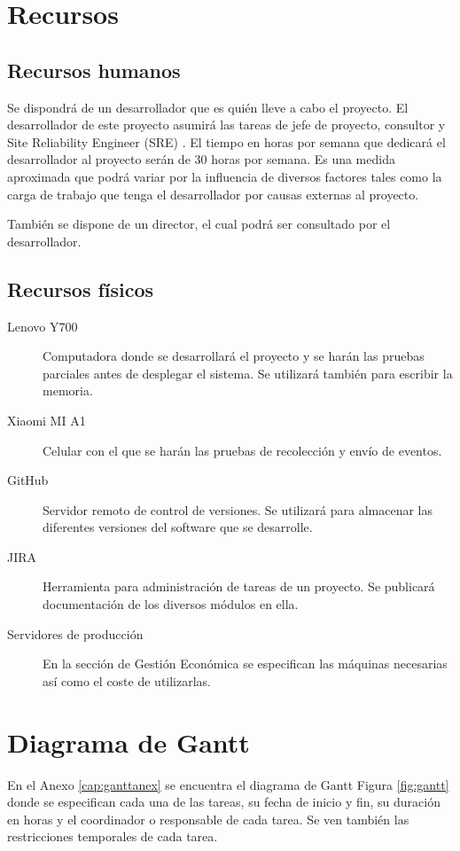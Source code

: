 \section{Recursos}
\subsection{Recursos humanos}
Se dispondrá de un desarrollador que es quién lleve a cabo el proyecto. El desarrollador de este proyecto asumirá las tareas de jefe de proyecto, consultor y Site Reliability Engineer (SRE) \cite{Tfg:sre}. El tiempo en horas por semana que dedicará el desarrollador al proyecto serán de 30 horas por semana. Es una medida aproximada que podrá variar por la influencia de diversos factores tales como la carga de trabajo que tenga el desarrollador por causas externas al proyecto.

También se dispone de un director, el cual podrá ser consultado por el desarrollador.

\subsection{Recursos físicos}\label{cap:recfis}
\begin{description}

	\item [Lenovo Y700] Computadora donde se desarrollará el proyecto y se harán las pruebas parciales antes de desplegar el sistema. Se utilizará también para escribir la memoria.
	
	\item [Xiaomi MI A1] Celular con el que se harán las pruebas de recolección y envío de eventos.
	
	\item [GitHub] Servidor remoto de control de versiones. Se utilizará para almacenar las diferentes versiones del software que se desarrolle.
	
	\item [JIRA] Herramienta para administración de tareas de un proyecto. Se publicará documentación de los diversos módulos en ella.
	
	\item [Servidores de producción] En la sección de Gestión Económica se especifican las máquinas necesarias así como el coste de utilizarlas.
\end{description}

\section{Diagrama de Gantt}\label{cap:gantt}
En el Anexo \ref{cap:ganttanex} se encuentra el diagrama de Gantt Figura \ref{fig:gantt} donde se especifican cada una de las tareas, su fecha de inicio y fin, su duración en horas y el coordinador o responsable de cada tarea. Se ven también las restricciones temporales de cada tarea.

